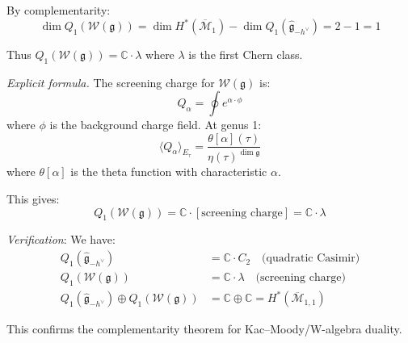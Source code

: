\begin{example}
By complementarity:
\begin{equation}
\dim Q_1(\mathcal{W}(\mathfrak{g})) = \dim H^*(\overline{\mathcal{M}}_1) - \dim Q_1(
\widehat{\mathfrak{g}}_{-h^\vee}) = 2 - 1 = 1
\end{equation}

Thus $Q_1(\mathcal{W}(\mathfrak{g})) = \mathbb{C} \cdot \lambda$ where $\lambda$ is 
the first Chern class.

\emph{Explicit formula.} The screening charge for $\mathcal{W}(\mathfrak{g})$ is:
\begin{equation}
Q_\alpha = \oint e^{\alpha \cdot \phi}
\end{equation}
where $\phi$ is the background charge field. At genus 1:
\begin{equation}
\langle Q_\alpha \rangle_{E_\tau} = \frac{\theta[\alpha](\tau)}{\eta(\tau)^{\dim 
\mathfrak{g}}}
\end{equation}
where $\theta[\alpha]$ is the theta function with characteristic $\alpha$.

This gives:
\begin{equation}
Q_1(\mathcal{W}(\mathfrak{g})) = \mathbb{C} \cdot [\text{screening charge}] = 
\mathbb{C} \cdot \lambda
\end{equation}

\emph{Verification}: We have:
\begin{align}
Q_1(\widehat{\mathfrak{g}}_{-h^\vee}) &= \mathbb{C} \cdot C_2 \quad \text{(quadratic 
Casimir)}\\
Q_1(\mathcal{W}(\mathfrak{g})) &= \mathbb{C} \cdot \lambda \quad \text{(screening 
charge)}\\
Q_1(\widehat{\mathfrak{g}}_{-h^\vee}) \oplus Q_1(\mathcal{W}(\mathfrak{g})) &= 
\mathbb{C} \oplus \mathbb{C} = H^*(\overline{\mathcal{M}}_{1,1})
\end{align}

This confirms the complementarity theorem for Kac--Moody/W-algebra duality.
\end{example}

